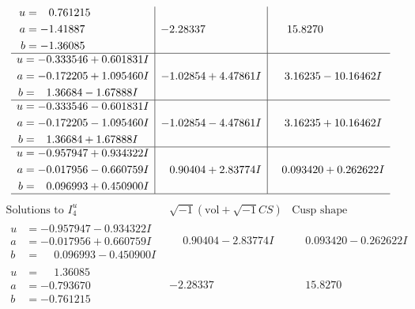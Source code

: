 \documentclass[1p]{elsarticle_modified}
\theoremstyle{definition}
\newcommand{\I}{\sqrt{-1}}
\begin{document}
$$\begin{array}{c|c|c}
\begin{aligned}
u &= \phantom{-}0.761215\phantom{ +0.000000I} \\
a &= -1.41887\phantom{ +0.000000I} \\
b &= -1.36085\phantom{ +0.000000I}\end{aligned}
 & -2.28337\phantom{ +0.000000I} & \phantom{-}15.8270\phantom{ +0.000000I} \\ \hline\begin{aligned}
u &= -0.333546 + 0.601831 I \\
a &= -0.172205 + 1.095460 I \\
b &= \phantom{-}1.36684 - 1.67888 I\end{aligned}
 & -1.02854 + 4.47861 I & \phantom{-}3.16235 - 10.16462 I \\ \hline\begin{aligned}
u &= -0.333546 - 0.601831 I \\
a &= -0.172205 - 1.095460 I \\
b &= \phantom{-}1.36684 + 1.67888 I\end{aligned}
 & -1.02854 - 4.47861 I & \phantom{-}3.16235 + 10.16462 I \\ \hline\begin{aligned}
u &= -0.957947 + 0.934322 I \\
a &= -0.017956 - 0.660759 I \\
b &= \phantom{-}0.096993 + 0.450900 I\end{aligned}
 & \phantom{-}0.90404 + 2.83774 I & \phantom{-}0.093420 + 0.262622 I\\
 \hline 
 \end{array}$$\newpage$$\begin{array}{c|c|c}  
\text{Solutions to }I^u_{4}& \I (\text{vol} + \sqrt{-1}CS) & \text{Cusp shape}\\
 \hline 
\begin{aligned}
u &= -0.957947 - 0.934322 I \\
a &= -0.017956 + 0.660759 I \\
b &= \phantom{-}0.096993 - 0.450900 I\end{aligned}
 & \phantom{-}0.90404 - 2.83774 I & \phantom{-}0.093420 - 0.262622 I \\ \hline\begin{aligned}
u &= \phantom{-}1.36085\phantom{ +0.000000I} \\
a &= -0.793670\phantom{ +0.000000I} \\
b &= -0.761215\phantom{ +0.000000I}\end{aligned}
 & -2.28337\phantom{ +0.000000I} & \phantom{-}15.8270\phantom{ +0.000000I} \\ \hline\begin{aligned}

\end{aligned}
\end{array}$$
\end{document}
